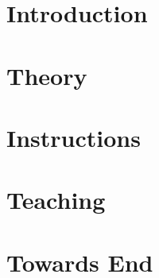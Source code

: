 \section[Intro]{Introduction}


\section[Theory]{Theory}


\section[Instructs]{Instructions}


\section[Teaching]{Teaching}


\section[End]{Towards End}
